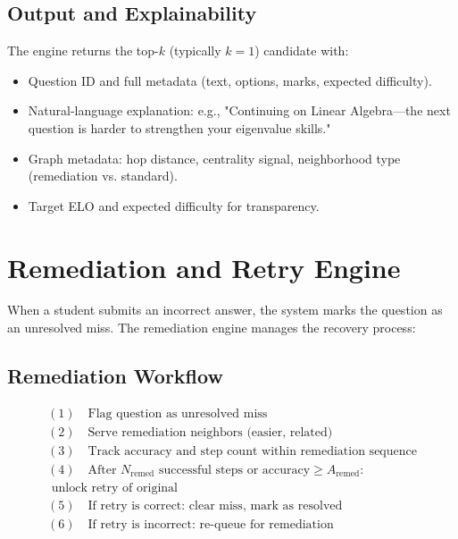 \documentclass[sigconf,authordraft,twoside]{acmart}
\begin{document}
\subsection{Output and Explainability}

The engine returns the top-$k$ (typically $k=1$) candidate with:

\begin{itemize}
\item Question ID and full metadata (text, options, marks, expected difficulty).
\item Natural-language explanation: e.g., "Continuing on Linear Algebra---the next question is harder to strengthen your eigenvalue skills."
\item Graph metadata: hop distance, centrality signal, neighborhood type (remediation vs. standard).
\item Target ELO and expected difficulty for transparency.
\end{itemize}

\section{Remediation and Retry Engine}

When a student submits an incorrect answer, the system marks the question as an unresolved miss. The remediation engine manages the recovery process:

\subsection{Remediation Workflow}

\begin{equation}
\boxed{\begin{array}{l}
(1) \quad \text{Flag question as unresolved miss} \\
(2) \quad \text{Serve remediation neighbors (easier, related)} \\
(3) \quad \text{Track accuracy and step count within remediation sequence} \\
(4) \quad \text{After } N_{\text{remed}} \text{ successful steps or accuracy} \geq A_{\text{remed}}: \\ \text{ unlock retry of original} \\
(5) \quad \text{If retry is correct: clear miss, mark as resolved} \\
(6) \quad \text{If retry is incorrect: re-queue for remediation}
\end{array}}
\end{equation}
\end{document}

